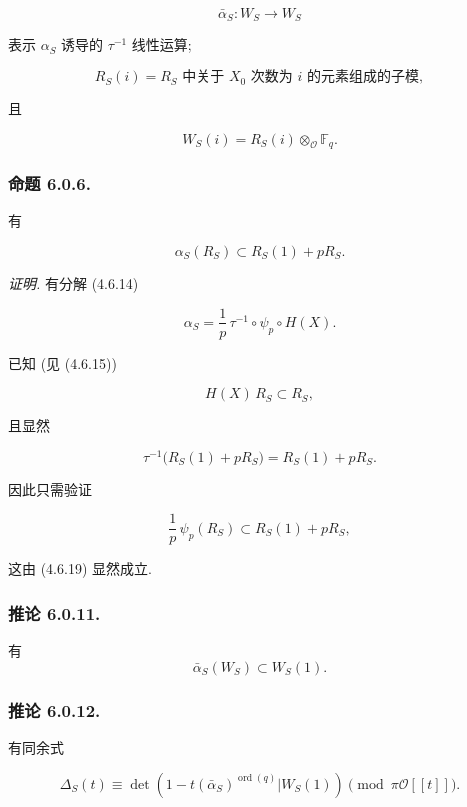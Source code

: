 \begin{equation}\tag{6.0.3}
\bar\alpha_S:W_S\longrightarrow W_S
\end{equation}

\noindent
表示 $\alpha_S$ 诱导的 $\tau^{-1}$ 线性运算;

\begin{equation}\tag{6.0.4}
R_S(i)
=\text{$R_S$ 中关于 $X_0$ 次数为 $i$ 的元素组成的子模},
\end{equation}

且

\begin{equation}\tag{6.0.5}
W_S(i)=R_S(i)\otimes_{\mathcal O}\mathbb F_q.
\end{equation}

\subsubsection*{命题 6.0.6.}
有

\[
\alpha_S(R_S)\subset R_S(1)+pR_S.
\]

\noindent\emph{证明.}
有分解 (4.6.14)

\begin{equation}\tag{6.0.7}
\alpha_S=\frac1p\,\tau^{-1}\circ\psi_p\circ H(X).
\end{equation}

已知 (见 (4.6.15))

\begin{equation}\tag{6.0.8}
H(X)\,R_S\subset R_S,
\end{equation}

且显然

\begin{equation}\tag{6.0.9}
\tau^{-1}\bigl(R_S(1)+pR_S\bigr)=R_S(1)+pR_S.
\end{equation}

因此只需验证

\begin{equation}\tag{6.0.10}
\frac1p\,\psi_p(R_S)\subset R_S(1)+pR_S,
\end{equation}

这由 (4.6.19) 显然成立.

\subsubsection*{推论 6.0.11.}
有
\[
\bar\alpha_S(W_S)\subset W_S(1).
\]

\subsubsection*{推论 6.0.12.}
有同余式

\[
\Delta_S(t)\equiv
\det\!\left(
1-t(\bar\alpha_S)^{\operatorname{ord}(q)}
\mathrel{\Big|}W_S(1)\right)
\pmod{\pi\mathcal O[[t]]}.
\]
